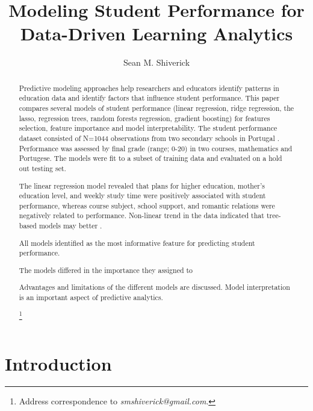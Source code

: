 \documentclass[sigconf]{acmart}
\begin{document}
  \title{Modeling Student Performance for Data-Driven Learning Analytics}
  \author{Sean M. Shiverick}
\renewcommand{\shortauthors}{S.M. Shiverick}


\begin{abstract}

Predictive modeling approaches help researchers and educators identify patterns 
in education data and identify factors that influence student performance. This 
paper compares several models of student performance (linear regression, ridge
regression, the lasso, regression trees, random forests regression, gradient 
boosting) for features selection, feature importance and model interpretability. 
The student performance dataset consisted of N=1044 observations from two 
secondary schools in Portugal \cite{cortez08}. Performance was assessed by 
final grade (range; 0-20) in two courses, mathematics and Portugese. The models
were fit to a subset of training data and evaluated on a hold out testing set. 

The linear regression model revealed that plans for higher education, mother's 
education level, and weekly study time were positively associated with student 
performance, whereas course subject, school support, and romantic relations
were negatively related to performance. Non-linear trend in the data indicated
that tree-based models may better . 

All models identified as the most informative feature for predicting 
student performance. 

The models differed in the importance they assigned to

Advantages and limitations of the different models are  discussed. 
Model interpretation is an important aspect of predictive analytics.


\footnote{Address correspondence to \textit{smshiverick@gmail.com}.}

\end{abstract}
\maketitle

\section{Introduction}
\end{document}
